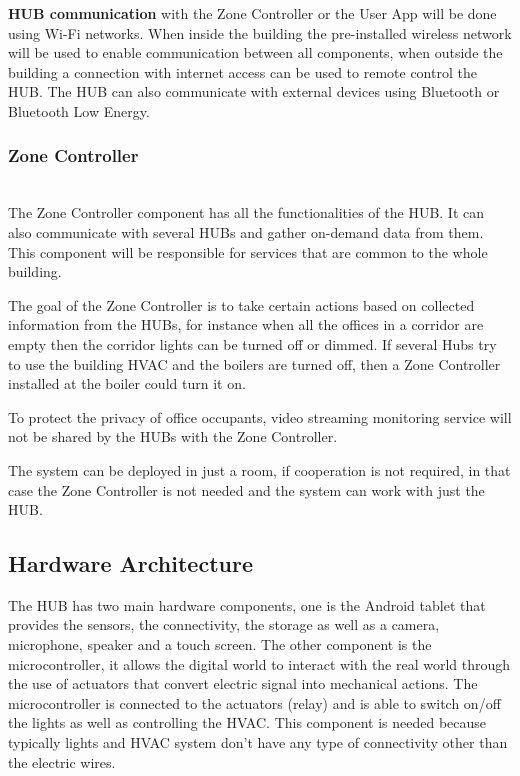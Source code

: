 \textbf{HUB communication} with the Zone Controller or the User App will be done using Wi-Fi networks. When inside the building the pre-installed wireless network will be used to enable communication between all components, when outside the building a connection with internet access can be used to remote control the HUB. The HUB can also communicate with external devices using Bluetooth or Bluetooth Low Energy.


\subsubsection{Zone Controller}\mbox{}\\

The Zone Controller component has all the functionalities of the HUB. It can also communicate with several HUBs and gather on-demand data from them. This component will be responsible for services that are common to the whole building.

The goal of the Zone Controller is to take certain actions based on collected information from the HUBs, for instance when all the offices in a corridor are empty then the corridor lights can be turned off or dimmed. If several Hubs try to use the building HVAC and the boilers are turned off, then a Zone Controller installed at the boiler could turn it on. 

To protect the privacy of office occupants, video streaming monitoring service will not be shared by the HUBs with the Zone Controller.

The system can be deployed in just a room, if cooperation is not required, in that case the Zone Controller is not needed and the system can work with just the HUB.



\subsection{Hardware Architecture}\label{architecture3} 

The HUB has two main hardware components, one is the Android tablet that provides the sensors, the connectivity, the storage as well as a camera, microphone, speaker and a touch screen. 
The other component is the microcontroller, it allows the digital world to interact with the real world through the use of actuators that convert electric signal into mechanical actions. The microcontroller is connected to the actuators (relay) and is able to switch on/off the lights as well as controlling the HVAC. This component is needed because typically lights and HVAC system don't have any type of connectivity other than the electric wires. 


